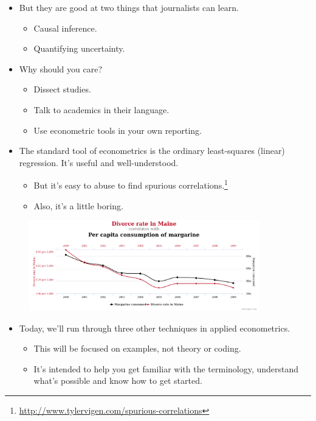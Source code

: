 \documentclass{beamer}
\begin{document}
\begin{frame}
	\begin{itemize}
		\item But they are good at two things that journalists can learn.
		\begin{itemize}
			\item Causal inference.
			\item Quantifying uncertainty.
		\end{itemize}
		\item Why should you care?
		\begin{itemize}
			\item Dissect studies.
			\item Talk to academics in their language.
			\item Use econometric tools in your own reporting.
		\end{itemize}
	\end{itemize}
\end{frame}

\begin{frame}
	\begin{itemize}
		\item The standard tool of econometrics is the ordinary least-squares (linear) regression. It's useful and well-understood.
		\begin{itemize}
			\item But it's easy to abuse to find spurious correlations.\footnote{\url{http://www.tylervigen.com/spurious-correlations}}
			\item Also, it's a little boring. 
		\end{itemize}
	\end{itemize}
	\begin{figure}
		\includegraphics[width=10cm]{spurious-correlations.png}
		\centering
	\end{figure}
\end{frame}

\begin{frame}
	\begin{itemize}
	\item Today, we'll run through three other techniques in applied econometrics.
		\begin{itemize}
			\item This will be focused on examples, not theory or coding.
			\item It's intended to help you get familiar with the terminology, understand what's possible and know how to get started.
		\end{itemize}
	\end{itemize}
\end{frame}
\end{document}
